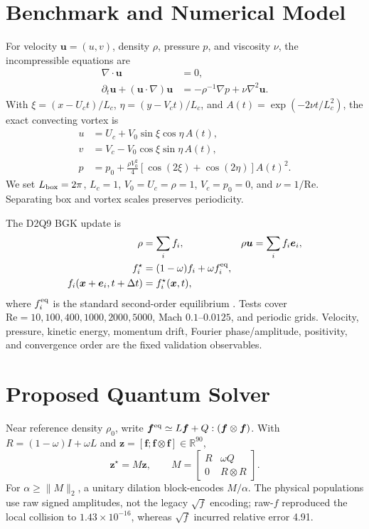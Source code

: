 \documentclass[10pt,twocolumn]{article}
\newcommand{\Rey}{\mathrm{Re}}
\newcommand{\vect}[1]{\bm{#1}}
\begin{document}
\section{Benchmark and Numerical Model}
For velocity $\vect u=(u,v)$, density $\rho$, pressure $p$, and viscosity
$\nu$, the incompressible equations are
\begin{align}
\nabla\!\cdot\vect u&=0,\\
\partial_t\vect u+(\vect u\!\cdot\!\nabla)\vect u
&=-\rho^{-1}\nabla p+\nu\nabla^2\vect u.
\end{align}
With $\xi=(x-U_ct)/L_c$, $\eta=(y-V_ct)/L_c$, and
$A(t)=\exp(-2\nu t/L_c^2)$, the exact convecting vortex is
\begin{align}
u&=U_c+V_0\sin\xi\cos\eta\,A(t),\\
v&=V_c-V_0\cos\xi\sin\eta\,A(t),\\
p&=p_0+\frac{\rho V_0^2}{4}[\cos(2\xi)+\cos(2\eta)]A(t)^2.
\end{align}
We set $L_{\rm box}=2\pi$, $L_c=1$, $V_0=U_c=\rho=1$,
$V_c=p_0=0$, and $\nu=1/\Rey$. Separating box and vortex scales preserves
periodicity.

The D2Q9 BGK update is
\begin{align}
\rho&=\sum_i f_i,&\rho\vect u&=\sum_i f_i\vect e_i,\\
f_i^{\star}&=(1-\omega)f_i+\omega f_i^{\rm eq},\\
f_i(\vect x+\vect e_i,t+\Delta t)&=f_i^\star(\vect x,t),
\end{align}
where $f_i^{\rm eq}$ is the standard second-order equilibrium
\cite{qian1992}. Tests cover $\Rey=10,100,400,1000,2000,5000$, Mach
$0.1$--$0.0125$, and periodic grids. Velocity, pressure, kinetic energy,
momentum drift, Fourier phase/amplitude, positivity, and convergence order are
the fixed validation observables.

\section{Proposed Quantum Solver}
Near reference density $\rho_0$, write
$\vect f^{\rm eq}\simeq L\vect f+Q:(\vect f\otimes\vect f)$. With
$R=(1-\omega)I+\omega L$ and
$\vect z=[\vect f;\vect f\otimes\vect f]\in\mathbb R^{90}$,
\begin{equation}
\vect z^\star=M\vect z,\qquad
M=\begin{bmatrix}R&\omega Q\\0&R\otimes R\end{bmatrix}.
\label{eq:carleman}
\end{equation}
For $\alpha\geq\lVert M\rVert_2$, a unitary dilation block-encodes $M/\alpha$.
The physical populations use raw signed amplitudes, not the legacy $\sqrt f$
encoding; raw-$f$ reproduced the local collision to $1.43\times10^{-16}$,
whereas $\sqrt f$ incurred relative error 4.91.
\end{document}
